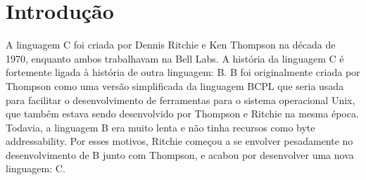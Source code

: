 \chapter*[Introdução]{Introdução}

    A linguagem C foi criada por Dennis Ritchie e Ken Thompson na década de 1970,
    enquanto ambos trabalhavam na Bell Labs. A história da linguagem C é fortemente
    ligada à história de outra linguagem: B. B foi originalmente criada por Thompson
    como uma versão simplificada da linguagem BCPL que seria usada para facilitar o
    desenvolvimento de ferramentas para o sistema operacional Unix, que também estava
    sendo desenvolvido por Thompson e Ritchie na mesma época. Todavia, a linguagem B 
    era muito lenta e não tinha recursos como byte addressability.  Por esses motivos, 
    Ritchie começou a se envolver pesadamente no desenvolvimento de B junto com Thompson,
    e acabou por desenvolver uma nova linguagem: C.

\newpage
